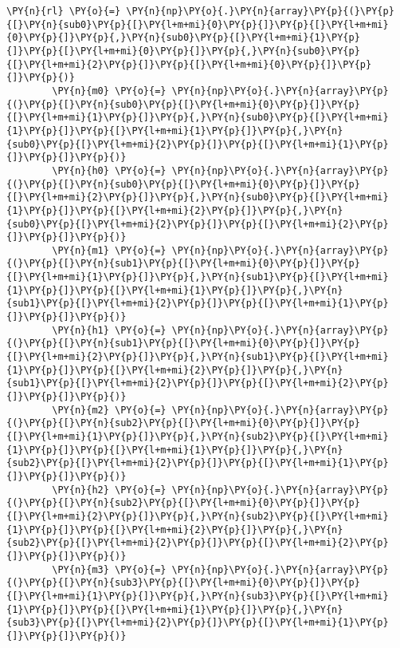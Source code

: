 {\begin{enumerate}
\begin{Verbatim}[commandchars=\\\{\}]
        \PY{n}{rl} \PY{o}{=} \PY{n}{np}\PY{o}{.}\PY{n}{array}\PY{p}{(}\PY{p}{[}\PY{n}{sub0}\PY{p}{[}\PY{l+m+mi}{0}\PY{p}{]}\PY{p}{[}\PY{l+m+mi}{0}\PY{p}{]}\PY{p}{,}\PY{n}{sub0}\PY{p}{[}\PY{l+m+mi}{1}\PY{p}{]}\PY{p}{[}\PY{l+m+mi}{0}\PY{p}{]}\PY{p}{,}\PY{n}{sub0}\PY{p}{[}\PY{l+m+mi}{2}\PY{p}{]}\PY{p}{[}\PY{l+m+mi}{0}\PY{p}{]}\PY{p}{]}\PY{p}{)}
        \PY{n}{m0} \PY{o}{=} \PY{n}{np}\PY{o}{.}\PY{n}{array}\PY{p}{(}\PY{p}{[}\PY{n}{sub0}\PY{p}{[}\PY{l+m+mi}{0}\PY{p}{]}\PY{p}{[}\PY{l+m+mi}{1}\PY{p}{]}\PY{p}{,}\PY{n}{sub0}\PY{p}{[}\PY{l+m+mi}{1}\PY{p}{]}\PY{p}{[}\PY{l+m+mi}{1}\PY{p}{]}\PY{p}{,}\PY{n}{sub0}\PY{p}{[}\PY{l+m+mi}{2}\PY{p}{]}\PY{p}{[}\PY{l+m+mi}{1}\PY{p}{]}\PY{p}{]}\PY{p}{)}
        \PY{n}{h0} \PY{o}{=} \PY{n}{np}\PY{o}{.}\PY{n}{array}\PY{p}{(}\PY{p}{[}\PY{n}{sub0}\PY{p}{[}\PY{l+m+mi}{0}\PY{p}{]}\PY{p}{[}\PY{l+m+mi}{2}\PY{p}{]}\PY{p}{,}\PY{n}{sub0}\PY{p}{[}\PY{l+m+mi}{1}\PY{p}{]}\PY{p}{[}\PY{l+m+mi}{2}\PY{p}{]}\PY{p}{,}\PY{n}{sub0}\PY{p}{[}\PY{l+m+mi}{2}\PY{p}{]}\PY{p}{[}\PY{l+m+mi}{2}\PY{p}{]}\PY{p}{]}\PY{p}{)}
        \PY{n}{m1} \PY{o}{=} \PY{n}{np}\PY{o}{.}\PY{n}{array}\PY{p}{(}\PY{p}{[}\PY{n}{sub1}\PY{p}{[}\PY{l+m+mi}{0}\PY{p}{]}\PY{p}{[}\PY{l+m+mi}{1}\PY{p}{]}\PY{p}{,}\PY{n}{sub1}\PY{p}{[}\PY{l+m+mi}{1}\PY{p}{]}\PY{p}{[}\PY{l+m+mi}{1}\PY{p}{]}\PY{p}{,}\PY{n}{sub1}\PY{p}{[}\PY{l+m+mi}{2}\PY{p}{]}\PY{p}{[}\PY{l+m+mi}{1}\PY{p}{]}\PY{p}{]}\PY{p}{)}
        \PY{n}{h1} \PY{o}{=} \PY{n}{np}\PY{o}{.}\PY{n}{array}\PY{p}{(}\PY{p}{[}\PY{n}{sub1}\PY{p}{[}\PY{l+m+mi}{0}\PY{p}{]}\PY{p}{[}\PY{l+m+mi}{2}\PY{p}{]}\PY{p}{,}\PY{n}{sub1}\PY{p}{[}\PY{l+m+mi}{1}\PY{p}{]}\PY{p}{[}\PY{l+m+mi}{2}\PY{p}{]}\PY{p}{,}\PY{n}{sub1}\PY{p}{[}\PY{l+m+mi}{2}\PY{p}{]}\PY{p}{[}\PY{l+m+mi}{2}\PY{p}{]}\PY{p}{]}\PY{p}{)}
        \PY{n}{m2} \PY{o}{=} \PY{n}{np}\PY{o}{.}\PY{n}{array}\PY{p}{(}\PY{p}{[}\PY{n}{sub2}\PY{p}{[}\PY{l+m+mi}{0}\PY{p}{]}\PY{p}{[}\PY{l+m+mi}{1}\PY{p}{]}\PY{p}{,}\PY{n}{sub2}\PY{p}{[}\PY{l+m+mi}{1}\PY{p}{]}\PY{p}{[}\PY{l+m+mi}{1}\PY{p}{]}\PY{p}{,}\PY{n}{sub2}\PY{p}{[}\PY{l+m+mi}{2}\PY{p}{]}\PY{p}{[}\PY{l+m+mi}{1}\PY{p}{]}\PY{p}{]}\PY{p}{)}
        \PY{n}{h2} \PY{o}{=} \PY{n}{np}\PY{o}{.}\PY{n}{array}\PY{p}{(}\PY{p}{[}\PY{n}{sub2}\PY{p}{[}\PY{l+m+mi}{0}\PY{p}{]}\PY{p}{[}\PY{l+m+mi}{2}\PY{p}{]}\PY{p}{,}\PY{n}{sub2}\PY{p}{[}\PY{l+m+mi}{1}\PY{p}{]}\PY{p}{[}\PY{l+m+mi}{2}\PY{p}{]}\PY{p}{,}\PY{n}{sub2}\PY{p}{[}\PY{l+m+mi}{2}\PY{p}{]}\PY{p}{[}\PY{l+m+mi}{2}\PY{p}{]}\PY{p}{]}\PY{p}{)}
        \PY{n}{m3} \PY{o}{=} \PY{n}{np}\PY{o}{.}\PY{n}{array}\PY{p}{(}\PY{p}{[}\PY{n}{sub3}\PY{p}{[}\PY{l+m+mi}{0}\PY{p}{]}\PY{p}{[}\PY{l+m+mi}{1}\PY{p}{]}\PY{p}{,}\PY{n}{sub3}\PY{p}{[}\PY{l+m+mi}{1}\PY{p}{]}\PY{p}{[}\PY{l+m+mi}{1}\PY{p}{]}\PY{p}{,}\PY{n}{sub3}\PY{p}{[}\PY{l+m+mi}{2}\PY{p}{]}\PY{p}{[}\PY{l+m+mi}{1}\PY{p}{]}\PY{p}{]}\PY{p}{)}

\end{Verbatim}
\end{enumerate}}
